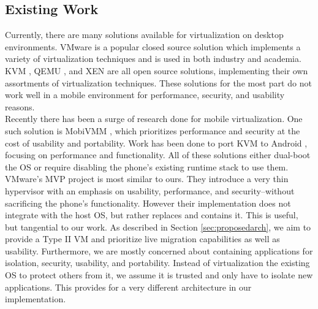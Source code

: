 \subsection{Existing Work}
Currently, there are many solutions available for virtualization on desktop environments.  VMware is a popular closed source solution which implements a variety of virtualization techniques and is used in both industry and academia.  KVM \cite{kvm}, QEMU \cite{qemu}, and XEN \cite{xen} are all open source solutions, implementing their own assortments of virtualization techniques.  These solutions for the most part do not work well in a mobile environment for performance, security, and usability reasons. \\

Recently there has been a surge of research done for mobile virtualization.  One such solution is MobiVMM \cite{mobivmm}, which prioritizes performance and security at the cost of usability and portability.  Work has been done to port KVM to Android \cite{columbia}, focusing on performance and functionality.  All of these solutions either dual-boot the OS or require disabling the phone's existing runtime stack to use them. \\

VMware's MVP project \cite{mvp} is most similar to ours.  They introduce a very thin hypervisor with an emphasis on usability, performance, and security--without sacrificing the phone's functionality.   However their implementation does not integrate with the host OS, but rather replaces and contains it.  This is useful, but tangential to our work.  As described in Section \ref{sec:proposedarch}, we aim to provide a Type II VM and prioritize live migration capabilities as well as usability.  Furthermore, we are mostly concerned about containing applications for isolation, security, usability, and portability.  Instead of virtualization the existing OS to protect others from it, we assume it is trusted and only have to isolate new applications.  This provides for a very different architecture in our implementation. \\

